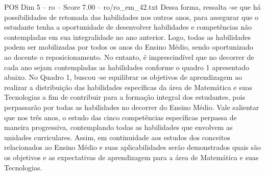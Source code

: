 \begin{textsample}{POS Dim 5 – ro – Score 7.00 – ro/ro\_em\_42.txt}
Dessa forma, ressalta -se que há possibilidades de retomada das habilidades nos outros anos, para assegurar que o estudante tenha a oportunidade de desenvolver habilidades e competências não contempladas em sua integralidade no ano anterior.
Logo, todas as habilidades podem ser mobilizadas por todos os anos do Ensino Médio, sendo oportunizado ao docente o reposicionamento.
No entanto, é imprescindível que no decorrer de cada ano sejam contempladas as habilidades conforme o quadro 1 apresentado abaixo.
No Quadro 1, buscou -se equilibrar os objetivos de aprendizagem ao realizar a distribuição das habilidades específicas da área de Matemática e suas Tecnologias a fim de contribuir para a formação integral dos estudantes, pois perpassarão por todas as habilidades no decorrer do Ensino Médio.
Vale salientar que nos três anos, o estudo das cinco competências específicas perpassa de maneira progressiva, contemplando todas as habilidades que envolvem as unidades curriculares.
Assim, em continuidade aos estudos dos conceitos relacionados ao Ensino Médio e suas aplicabilidades serão demonstrados quais são os objetivos e as expectativas de aprendizagem para a área de Matemática e suas Tecnologias.

\end{textsample}
